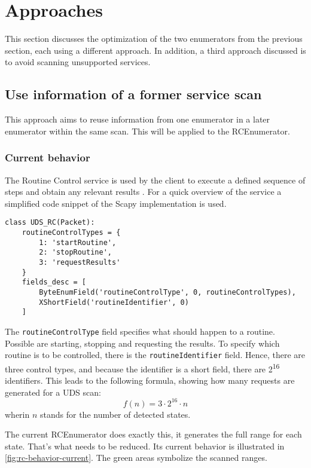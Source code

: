 \section{Approaches}

This section discusses the optimization of the two enumerators from the previous section, each using a different approach. In addition, a third approach discussed is to avoid scanning unsupported services. 

\subsection{Use information of a former service scan}

This approach aims to reuse information from one enumerator in a later enumerator within the same scan. This will be applied to the RCEnumerator.

\subsubsection{Current behavior}

The Routine Control service is used by the client to execute a defined sequence of steps and obtain any relevant results \cite{iso14229}. For a quick overview of the service a simplified code snippet of the Scapy implementation is used.

\begin{samepage}
\begin{verbatim}
class UDS_RC(Packet):
    routineControlTypes = {
        1: 'startRoutine',
        2: 'stopRoutine',
        3: 'requestResults'
    }
    fields_desc = [
        ByteEnumField('routineControlType', 0, routineControlTypes),
        XShortField('routineIdentifier', 0)
    ]
\end{verbatim}
\end{samepage}

The \texttt{routineControlType} field specifies what should happen to a routine. Possible are starting, stopping and requesting the results. To specify which routine is to be controlled, there is the \texttt{routineIdentifier} field. Hence, there are three control types, and because the identifier is a short field, there are 2\textsuperscript{16} identifiers. This leads to the following formula, showing how many requests are generated for a UDS scan:
\[f(n)=3 \cdot 2^{16} \cdot n\]
wherin $n$ stands for the number of detected states.

The current RCEnumerator does exactly this, it generates the full range for each state. That's what needs to be reduced. Its current behavior is illustrated in \autoref{fig:rc-behavior-current}. The green areas symbolize the scanned ranges.

